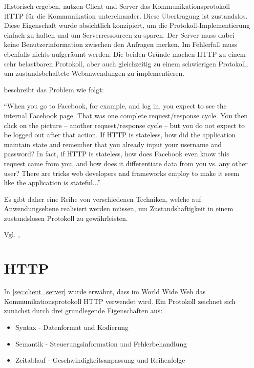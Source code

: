 Historisch ergeben, nutzen Client und Server das Kommunikationsprotokoll HTTP für die Kommunikation untereinander. Diese Übertragung ist zustandslos. Diese Eigenschaft wurde absichtlich konzipiert, um die Protokoll-Implementierung einfach zu halten und um Serverressourcen zu sparen. Der Server muss dabei keine Benutzerinformation zwischen den Anfragen merken. Im Fehlerfall muss ebenfalls nichts aufgeräumt werden. Die beiden Gründe machen HTTP zu einem sehr belastbaren Protokoll, aber auch gleichzeitig zu einem schwierigen Protokoll, um zustandsbehaftete Webanwendungen zu implementieren.

\cite[Background]{Parikh:2015} beschreibt das Problem wie folgt:

\enquote{When you go to Facebook, for example, and log in, you expect to see the internal Facebook page. That was one complete request/response cycle. You then click on the picture -- another request/response cycle -- but you do not expect to be logged out after that action. If HTTP is stateless, how did the application maintain state and remember that you already input your username and password? In fact, if HTTP is stateless, how does Facebook even know this request came from you, and how does it differentiate data from you vs. any other user? There are tricks web developers and frameworks employ to make it seem like the application is stateful...}

Es gibt daher eine Reihe von verschiedenen Techniken, welche auf Anwendungsebene realisiert werden müssen, um Zustandshaftigkeit in einem zustandslosen Protokoll zu gewährleisten.

Vgl. \cite[Background]{Parikh:2015}, \cite{Culloca:2006}

\section{HTTP}

In \ref{sec:client_server} wurde erwähnt, dass im World Wide Web das Kommunikationsprotokoll HTTP verwendet wird. Ein Protokoll zeichnet sich zunächst durch drei grundlegende Eigenschaften aus:

\begin{itemize}
\item Syntax - Datenformat und Kodierung
\item Semantik - Steuerungsinformation und Fehlerbehandlung
\item Zeitablauf - Geschwindigkeitsanpassung und Reihenfolge
\end{itemize}

